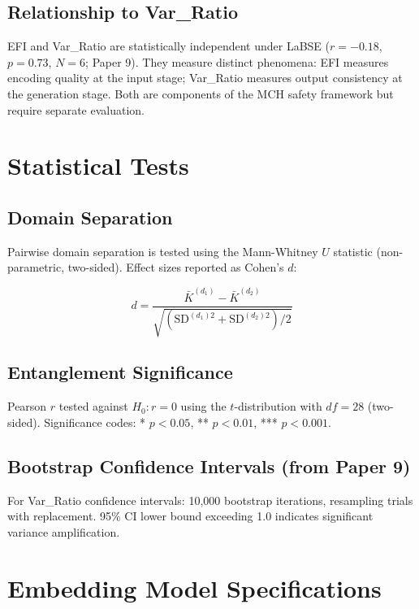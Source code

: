 \documentclass[11pt,a4paper]{article}
\begin{document}
\subsection{Relationship to Var\_Ratio}

EFI and Var\_Ratio are statistically independent under LaBSE ($r = -0.18$,
$p = 0.73$, $N = 6$; Paper 9). They measure distinct phenomena: EFI measures
encoding quality at the input stage; Var\_Ratio measures output consistency at the
generation stage. Both are components of the MCH safety framework but require
separate evaluation.

\section{Statistical Tests}

\subsection{Domain Separation}

Pairwise domain separation is tested using the Mann-Whitney $U$ statistic
(non-parametric, two-sided). Effect sizes reported as Cohen's $d$:

\begin{equation}
    d = \frac{\bar{K}^{(d_1)} - \bar{K}^{(d_2)}}
    {\sqrt{\left(\text{SD}^{(d_1)2} + \text{SD}^{(d_2)2}\right)/2}}
\end{equation}

\subsection{Entanglement Significance}

Pearson $r$ tested against $H_0: r = 0$ using the $t$-distribution with $df = 28$
(two-sided). Significance codes: * $p < 0.05$, ** $p < 0.01$, *** $p < 0.001$.

\subsection{Bootstrap Confidence Intervals (from Paper 9)}

For Var\_Ratio confidence intervals: 10,000 bootstrap iterations, resampling
trials with replacement. 95\% CI lower bound exceeding 1.0 indicates significant
variance amplification.

\section{Embedding Model Specifications}
\end{document}
